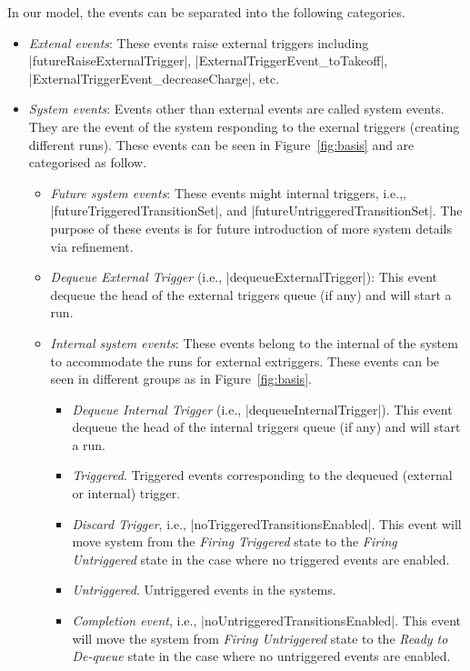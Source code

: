 In our \EventB model, the events can be separated into the following
categories.
\begin{itemize}
\item \emph{Extenal events}: These events raise external triggers
  including |futureRaiseExternalTrigger|, |ExternalTriggerEvent_toTakeoff|,
  |ExternalTriggerEvent_decreaseCharge|, etc.
  
\item \emph{System events}: Events other than external events are
  called system events. They are the event of the system responding to
  the exernal triggers (creating different runs).  These events can be
  seen in Figure~\ref{fig:basis} and are categorised as follow.
  \begin{itemize}
  \item \emph{Future system events}: These events might internal
    triggers, i.e.,, |futureTriggeredTransitionSet|, and
    |futureUntriggeredTransitionSet|.  The purpose of these events is
    for future introduction of more system details via refinement.
    
  \item \emph{Dequeue External Trigger} (i.e.,
    |dequeueExternalTrigger|): This event dequeue the head of the
    external triggers queue (if any) and will start a run.

  \item \emph{Internal system events}: These events belong to the
    internal of the system to accommodate the runs for external
    extriggers.  These events can be seen in different groups as in
    Figure~\ref{fig:basis}.
    \begin{itemize}
    \item \emph{Dequeue Internal Trigger} (i.e.,
      |dequeueInternalTrigger|). This event dequeue the head of the
      internal triggers queue (if any) and will start a run.
    
    \item \emph{Triggered}. Triggered events corresponding to the
      dequeued (external or internal) trigger.

    \item \emph{Discard Trigger}, i.e.,
      |noTriggeredTransitionsEnabled|.  This event will move system
      from the \emph{Firing Triggered} state to the \emph{Firing
        Untriggered} state in the case where no triggered events are
      enabled.
    
    \item \emph{Untriggered}.  Untriggered events in the systems.

    \item \emph{Completion event}, i.e.,
      |noUntriggeredTransitionsEnabled|. This event will move the
      system from \emph{Firing Untriggered} state to the \emph{Ready
        to De-queue} state in the case where no untriggered events are
      enabled.
    \end{itemize}
  \end{itemize}
\end{itemize}

